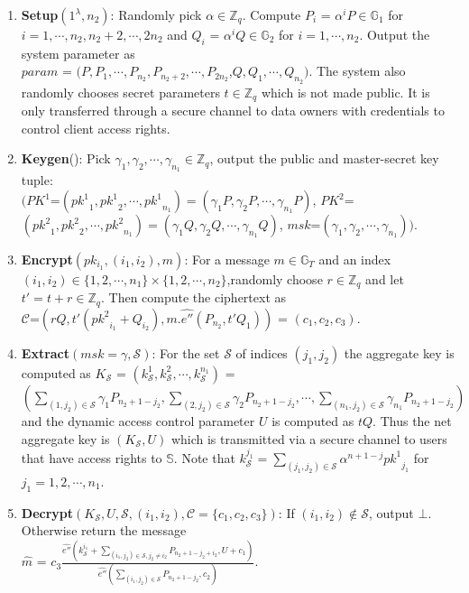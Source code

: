 \begin{enumerate}
 \item \textbf{Setup}$(1^{\lambda},n_2)$: Randomly pick $\alpha \in \mathbb{Z}_q$. Compute $P_i$ = ${\alpha^{i}}P \in \mathbb{G}_1$ for $i = 1,\cdots,n_2,n_2+2,\cdots,2n_2$ and $Q_i$ = ${\alpha^{i}}Q \in \mathbb{G}_2$ for $i = 1,\cdots,n_2$. Output the system parameter as\\
 $param$ = $(P,P_1,\cdots,P_{n_2},P_{n_2+2},\cdots,P_{2n_2}$,$Q,Q_1,\cdots,Q_{n_2})$. The system also randomly chooses secret parameters $t \in \mathbb{Z}_q$ which is not made public. It is only transferred through a secure channel to data owners with credentials to control client access rights.
 \item \textbf{Keygen}(): Pick $\gamma_1,\gamma_2,\cdots,\gamma_{n_1} \in \mathbb{Z}_q$, output the public and master-secret key tuple:\\ $(PK^1$=$({pk^1}_1,{pk^1}_{2},\cdots,{pk^1}_{n_1})=(\gamma_1P,\gamma_2P,\cdots,\gamma_{n_1}P)$, $PK^2$=\\$({pk^2}_1,{pk^2}_{2},\cdots,{pk^2}_{n_1})=(\gamma_1Q,\gamma_2Q,\cdots,\gamma_{n_1}Q)$, $msk$=$(\gamma_1,\gamma_2,\cdots,\gamma_{n_1}))$.
 
 \item \textbf{Encrypt}$(pk_{i_1},(i_1,i_2),m)$: For a message $m \in \mathbb{G}_T$ and an index $(i_1,i_2) \in \{1,2,\cdots,n_1\}\times\{1,2,\cdots,n_2\}$,randomly choose $r\in\mathbb{Z}_q$ and let $t'=t+r \in\mathbb{Z}_q$. Then compute the ciphertext as\\
 $\mathcal{C}$=$(rQ,t'({pk^2}_{i_1}+Q_{i_2}),m.\hat{e''}(P_{n_2},t'Q_1))$ = $(c_1,c_2,c_3)$.
 \item \textbf{Extract}$(msk=\gamma,\mathcal{S})$: For the set $\mathcal{S}$ of indices $(j_1,j_2)$ the aggregate key is computed as $K_{\mathcal{S}}$ = $(k^{1}_{\mathcal{S}},k^{2}_{\mathcal{S}},\cdots,k^{n_1}_{\mathcal{S}})$ =\\ $(\sum_{(1,j_2)\in\mathcal{S}}{\gamma_{1}}P_{n_2+1-j_2},\sum_{(2,j_2)\in\mathcal{S}}{\gamma_{2}}P_{n_2+1-j_2},\cdots,\sum_{(n_1,j_2)\in\mathcal{S}}{\gamma_{n_1}}P_{n_2+1-j_2})$\\ and the dynamic access control parameter $U$ is computed as $tQ$. Thus the net aggregate key is $(K_{\mathcal{S}},U)$ which is transmitted via a secure channel to users that have access rights to $\mathbb{S}$. Note that  $k^{j_1}_{\mathcal{S}}=\sum_{(j_1,j_2)\in\mathcal{S}}\alpha^{n+1-j}{pk^1}_{j_1}$ for $j_1=1,2,\cdots,n_1$. 
 \item \textbf{Decrypt}$(K_{\mathcal{S}}, U, \mathcal{S},(i_1,i_2),\mathcal{C}=\{c_1,c_2,c_3\})$: If $(i_1,i_2)\notin\mathcal{S}$, output $\bot$. Otherwise return the message\\ $\hat{m}$ = $c_3\frac{\hat{e''}(k^{i_1}_{\mathcal{S}}+\sum_{(i_1,j_2)\in\mathcal{S},j_2\neq i_2}P_{n_2+1-j_2+i_2},U+c_1)}{\hat{e''}(\sum_{(i_1,j_2)\in\mathcal{S}}P_{n_2+1-j_2},c_2)}$. 
\end{enumerate}

